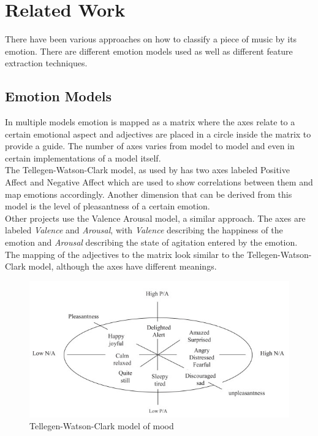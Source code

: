 \documentclass{sigchi-ext}
\begin{document}
\section{Related Work}
There have been various approaches on how to classify a piece of music by its emotion. There are different emotion models used as well as different feature extraction techniques.

\subsection{Emotion Models}
In multiple models emotion is mapped as a matrix where the axes relate to a certain emotional aspect and adjectives are placed in a circle inside the matrix to provide a guide. The number of axes varies from model to model and even in certain implementations of a model itself.\\
The Tellegen-Watson-Clark model, as used by \cite{Trohidis2011} has two axes labeled Positive Affect and Negative Affect which are used to show correlations between them and map emotions accordingly. Another dimension that can be derived from this model is the level of pleasantness of a certain emotion.\\

Other projects use the Valence Arousal model, a similar approach. The axes are labeled \textit{Valence} and \textit{Arousal}, with \textit{Valence} describing the happiness of the emotion and \textit{Arousal} describing the state of agitation entered by the emotion. The mapping of the adjectives to the matrix look similar to the Tellegen-Watson-Clark model, although the axes have different meanings.

\begin{figure}
	\label{tellegen-nwatson-clark}
	\includegraphics[width=\linewidth]{images/tellegen-watson-clark-model.jpg}
	\caption{Tellegen-Watson-Clark model of mood \cite{Tellegen1999}}
\end{figure}
\end{document}
